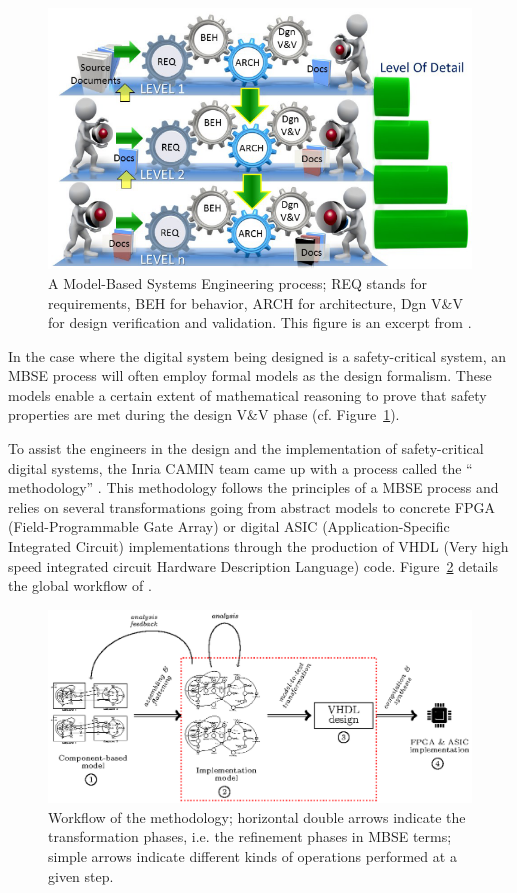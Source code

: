 \documentclass[pdflatex,sn-mathphys]{sn-jnl}%
\theoremstyle{thmstyleone}%
\theoremstyle{thmstyletwo}%
\theoremstyle{thmstylethree}%
\begin{document}
\begin{figure}[H] \centering
\includegraphics[keepaspectratio,width=.5\textwidth]{MBSE-ps.png}
  \caption[A Model-Based Systems Engineering process.]{A Model-Based
Systems Engineering process; REQ stands for requirements, BEH for
behavior, ARCH for architecture, Dgn V\&V for design verification and
validation. This figure is an excerpt from \cite{Long2011}.}
  \label{fig:MBSE-ps}
\end{figure}

In the case where the digital system being designed is a
safety-critical system, an MBSE process will often employ formal
models as the design formalism. These models enable a certain extent
of mathematical reasoning to prove that safety properties are met
during the design V\&V phase (cf. Figure~\ref{fig:MBSE-ps}).

To assist the engineers in the design and the implementation of
safety-critical digital systems, the Inria CAMIN team came up with a
process called the ``\hilecop{} methodology'' \cite{Andreu2009}.  This
methodology follows the principles of a MBSE process and relies on
several transformations going from abstract models to concrete FPGA
(Field-Programmable Gate Array) or digital ASIC (Application-Specific
Integrated Circuit) implementations through the production of VHDL
(Very high speed integrated circuit Hardware Description Language)
code. Figure~\ref{fig:hilecop-wf} details the global workflow of
\hilecop{}.

\begin{figure}[H]
\centering
\includegraphics[keepaspectratio=true,width=\textwidth]{hilecop-wf-focus-preuve.eps}
\caption[Workflow of the \hilecop{} methodology.]{Workflow of the
  \hilecop{} methodology; horizontal double arrows indicate the
  transformation phases, i.e. the refinement phases in MBSE terms;
  simple arrows indicate different kinds of operations performed at a
  given step.}
\label{fig:hilecop-wf}
\end{figure}
\end{document}
